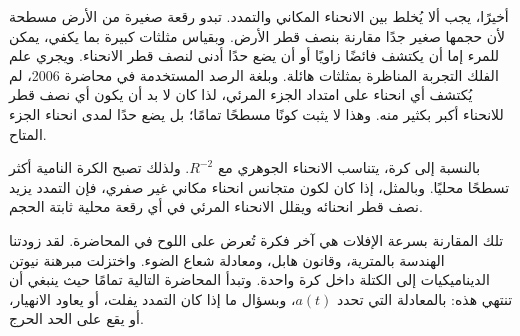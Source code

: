 \begin{classroomqa}
\end{classroomqa}

أخيرًا، يجب ألا يُخلط بين الانحناء المكاني والتمدد. تبدو رقعة صغيرة من الأرض مسطحة لأن حجمها صغير جدًا مقارنة بنصف قطر الأرض. وبقياس مثلثات كبيرة بما يكفي، يمكن للمرء إما أن يكتشف فائضًا زاويًا أو أن يضع حدًا أدنى لنصف قطر الانحناء. ويجري علم الفلك التجربة المناظرة بمثلثات هائلة. وبلغة الرصد المستخدمة في محاضرة 2006، لم يُكتشف أي انحناء على امتداد الجزء المرئي، لذا كان لا بد أن يكون أي نصف قطر للانحناء أكبر بكثير منه. وهذا لا يثبت كونًا مسطحًا تمامًا؛ بل يضع حدًا لمدى انحناء الجزء المتاح.

بالنسبة إلى كرة، يتناسب الانحناء الجوهري مع \(R^{-2}\). ولذلك تصبح الكرة النامية أكثر تسطحًا محليًا. وبالمثل، إذا كان لكون متجانس انحناء مكاني غير صفري، فإن التمدد يزيد نصف قطر انحنائه ويقلل الانحناء المرئي في أي رقعة محلية ثابتة الحجم.

\begin{classroomqa}
\end{classroomqa}

تلك المقارنة بسرعة الإفلات هي آخر فكرة تُعرض على اللوح في المحاضرة. لقد زودتنا الهندسة بالمترية، وقانون هابل، ومعادلة شعاع الضوء. واختزلت مبرهنة نيوتن الديناميكيات إلى الكتلة داخل كرة واحدة. وتبدأ المحاضرة التالية تمامًا حيث ينبغي أن تنتهي هذه: بالمعادلة التي تحدد \(a(t)\)، وبسؤال ما إذا كان التمدد يفلت، أو يعاود الانهيار، أو يقع على الحد الحرج.
